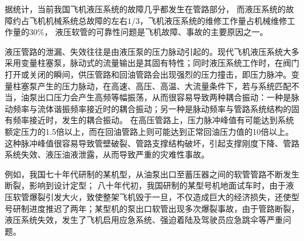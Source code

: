 据统计，当前我国飞机液压系统的故障几乎都发生在管路部分，
而液压系统的故障约占飞机机械系统总故障的左右$1/3 $，飞机液压系统的维修工作量占机械维修工作量的$ 30\%$\cite{lijun2007}，
液压软管的可靠性问题是飞机故障、事故的主要原因之一。

液压管路的泄漏、失效往往是由液压泵的压力脉动引起的。现代飞机液压系统大多采用变量柱塞泵，脉动式的流量输出是其固有特性；同时液压系统工作时，在阀门打开或关闭的瞬间，供压管路和回油管路会出现强烈的压力撞击，即压力脉冲。变量柱塞泵产生的压力脉动，在高速、高压、高温、大流量条件下，若与系统匹配不当，油泵出口压力会产生高频等幅振荡，从而很容易导致两种耦合振动：一种是脉动频率与流体谐振频率接近时的耦合振动；另一种是脉动频率与管路系统结构的固有频率接近时，发生的耦合振动。
在高压管路上，压力脉冲峰值有可能达到系统额定压力的1.5倍以上，而在回油管路上则可能达到正常回油压力值的10倍以上\cite{lijun2007}。
这种脉冲峰值很容易导致管壁破裂、管路支撑结构破坏，引起支撑刚度下降、管路系统失效、液压油液泄露，从而导致严重的灾难性事故\cite{gaofeng2013}。


例如，我国七十年代研制的某机型，从油泵出口至蓄压器之间的软管管路不断发生断裂，影响到设计定型；
八十年代初，我国研制的某型号机地面试车时，由于液压软管爆裂引发大火，致使整架飞机毁于一旦，不仅造成巨大的经济损失，还使型号研制进度推迟了两年；某型机的泵出口软管出现多次爆裂事故，由于管路断裂，液压系统失效，发生了飞机启用应急系统、强迫着陆及驾驶员应急跳伞等严重问题\cite{lijun2007,guoqing2010,gaofeng2013}。

\begin{figure}
	\centering
	\hspace{1cm}
	\label{fig:plane-hose-2}
\end{figure}

